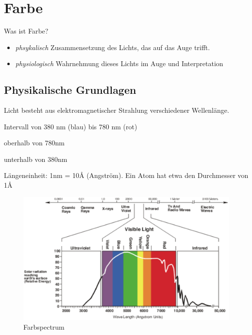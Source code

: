 \chapter{Farbe}
Was ist Farbe?
\begin{itemize}[labelindent=1cm]
  \item \textit{phsykalisch} Zusammensetzung des Lichts, das auf das Auge trifft.
  \item \textit{physiologisch} Wahrnehmung dieses Lichts im Auge und Interpretation
\end{itemize}


\section{Physikalische Grundlagen}
Licht besteht aus elektromagnetischer Strahlung verschiedener Wellenlänge.
\begin{description}[labelindent=1cm]
  \item[sichtbares Licht] Intervall von 380 nm (blau) bis 780 nm (rot)
  \item[infrarot] oberhalb von 780nm
  \item[ultraviolett] unterhalb von 380nm
\end{description}
Längeneinheit: 1nm = 10Å (Angström). Ein Atom hat etwa den Durchmesser von 1Å
\begin{figure}[!ht]
\centering
\includegraphics[width=0.7\linewidth]{fig/farbspectrum}
\caption{Farbspectrum}
\label{fig:farbspectrum}
\end{figure}


